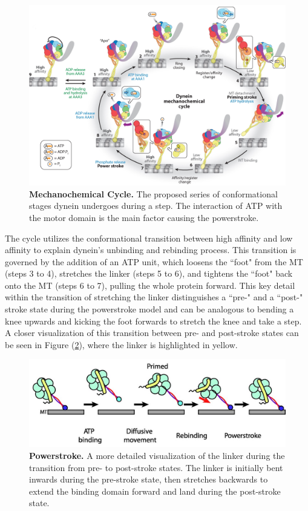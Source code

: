\begin{figure}[H]
	\centering
	\includegraphics[width=1\columnwidth]{Figures/mechanochemical_cycle.jpeg}
	\caption[Mechanochemical Cycle]{\textbf{Mechanochemical Cycle.} The proposed series of conformational stages dynein undergoes during a step. The interaction of ATP with the motor domain is the main factor causing the powerstroke.  \cite{Cianfrocco2015mechanism}}
	\label{fig:MechanochemicalCycle}
\end{figure}

The cycle utilizes the conformational transition between high affinity and low affinity to explain dynein's unbinding and rebinding process. This transition is governed by the addition of an ATP unit, which loosens the ``foot" from the MT (steps 3 to 4), stretches the linker (steps 5 to 6), and tightens the ``foot" back onto the MT (steps 6 to 7), pulling the whole protein forward. This key detail within the transition of stretching the linker distinguishes a ``pre-" and a ``post-" stroke state during the powerstroke model and can be analogous to bending a knee upwards and kicking the foot forwards to stretch the knee and take a step. A closer visualization of this transition between pre- and post-stroke states can be seen in Figure (\ref{fig:Powerstroke}), where the linker is highlighted in yellow.  

\begin{figure}[H]
	\centering
	\includegraphics[width=1\columnwidth]{Figures/powerstroke.jpeg}
	\caption[Powerstroke]{\textbf{Powerstroke.} A more detailed visualization of the linker during the transition from pre- to post-stroke states. The linker is initially bent inwards during the pre-stroke state, then stretches backwards to extend the binding domain forward and land during the post-stroke state. \cite{Carter2010communication} }
	\label{fig:Powerstroke}
\end{figure}

